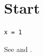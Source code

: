 \documentclass{article}
\begin{document}
\section{Start}
\begin{lstlisting}[caption={A listing},label=lst1]
x = 1
\end{lstlisting}
See  and .
\end{document}
